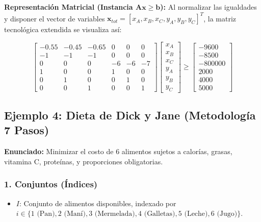 \documentclass{article}
\begin{document}
	\textbf{Representación Matricial (Instancia $\mathbf{A x} \geq \mathbf{b}$):}
	Al normalizar las igualdades y disponer el vector de variables $\mathbf{x}_{tot} = [x_A, x_B, x_C, y_A, y_B, y_C]^T$, la matriz tecnológica extendida se visualiza así:
	
	$$
	\begin{bmatrix}
		-0.55 & -0.45 & -0.65 & 0 & 0 & 0 \\
		-1 & -1 & -1 & 0 & 0 & 0 \\
		0 & 0 & 0 & -6 & -6 & -7 \\
		1 & 0 & 0 & 1 & 0 & 0 \\
		0 & 1 & 0 & 0 & 1 & 0 \\
		0 & 0 & 1 & 0 & 0 & 1
	\end{bmatrix}
	\begin{bmatrix} 
		x_A \\ x_B \\ x_C \\ y_A \\ y_B \\ y_C 
	\end{bmatrix}
	\geq 
	\begin{bmatrix} 
		-9600 \\ -8500 \\ -800000 \\ 2000 \\ 4000 \\ 5000 
	\end{bmatrix}
	$$
	
	\newpage
	
	\subsection{Ejemplo 4: Dieta de Dick y Jane (Metodología 7 Pasos)}
	
	\textbf{Enunciado:} Minimizar el costo de 6 alimentos sujetos a calorías, grasas, vitamina C, proteínas, y proporciones obligatorias.
	
	\subsubsection*{1. Conjuntos (Índices)}
	\begin{itemize}
		\item $I$: Conjunto de alimentos disponibles, indexado por $i \in \{1 \text{ (Pan)}, 2 \text{ (Maní)}, 3 \text{ (Mermelada)}, 4 \text{ (Galletas)}, 5 \text{ (Leche)}, 6 \text{ (Jugo)}\}$.
	\end{itemize}
	
\end{document}
